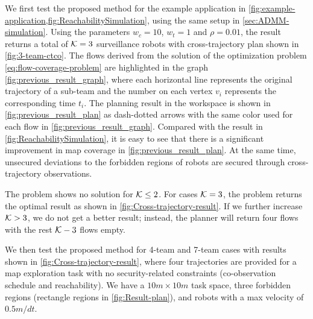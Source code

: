 \documentclass[10pt,twocolumn,twoside]{IEEEtran}
\begin{document}
We first test the proposed method for the example application in \cref{fig:example-application,fig:ReachabilitySimulation}, using the same setup in \cref{sec:ADMM-simulation}. Using the parameters $w_{c}=10$, $w_{t}=1$ and $\rho = 0.01$, the result returns a total of $\mathcal{K}=3$ surveillance robots with cross-trajectory plan shown in \cref{fig:3-team-ctco}. 
The flows derived from the solution of the optimization problem \eqref{eq:flow-coverage-problem} are highlighted in the graph \cref{fig:previous_result_graph}, where each horizontal line represents the original trajectory of a sub-team and the number on each vertex $v_{i}$ represents the corresponding time $t_{i}$. The planning result in the workspace is shown in \cref{fig:previous_result_plan} as dash-dotted arrows with the same color used for each flow in \cref{fig:previous_result_graph}. Compared with the result in \cref{fig:ReachabilitySimulation}, it is easy to see that there is a significant improvement in map coverage in \cref{fig:previous_result_plan}. At the same time, unsecured deviations to the forbidden regions of robots are secured through cross-trajectory observations. 

The problem shows no solution for $\mathcal{K}\leq 2$. For cases $\mathcal{K}=3$, the problem returns the optimal result as shown in \cref{fig:Cross-trajectory-result}. If we further increase $\mathcal{K}>3$, we do not get a better result; instead, the planner will return four flows with the rest $\mathcal{K}-3$ flows empty. 

We then test the proposed method for 4-team and 7-team cases with results shown in \cref{fig:Cross-trajectory-result}, where four trajectories are provided for a map exploration task with no security-related constraints (co-observation schedule and reachability). We have a $10m\times10m$ task space, three forbidden regions (rectangle regions in \cref{fig:Result-plan}), and robots with a max velocity of $0.5m/dt$. 
\end{document}

